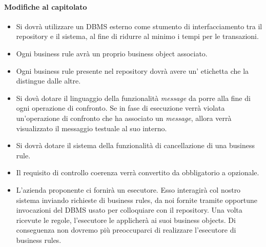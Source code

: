 \documentclass[11pt,titlepage,a4paper]{report}
\begin{document}
\paragraph{Modifiche al capitolato}

\begin{itemize}

\item Si dovr\`a utilizzare un DBMS esterno come stumento di interfacciamento tra il repository e il sistema, al fine di ridurre al minimo i tempi per le transazioni.

\item Ogni business rule avr\`a un proprio business object associato.

\item Ogni business rule presente nel repository dovr\`a avere un' etichetta che la distingue dalle altre.

\item Si dov\`a dotare il linguaggio della funzionalit\`a \textit{message} da porre alla fine di ogni operazione di confronto. Se in fase di esecuzione verr\`a violata un'operazione di confronto che ha associato un \textit{message}, allora verr\`a visualizzato il messaggio testuale al suo interno.

\item Si dovr\`a dotare il sistema della funzionalit\`a di cancellazione di una business rule.

\item Il requisito di controllo coerenza verr\`a convertito da obbligatorio a opzionale.

\item L'azienda proponente ci fornir\`a un esecutore. Esso interagir\`a col nostro sistema inviando richieste di business rules, da noi fornite tramite opportune invocazioni del DBMS usato per colloquiare con il repository. Una volta ricevute le regole, l'esecutore le applicher\`a ai suoi business objects. Di conseguenza non dovremo pi\`u preoccuparci di realizzare l'esecutore di business rules.
\end{itemize}
\end{document}
